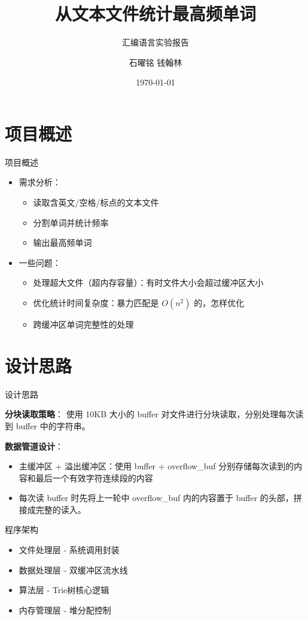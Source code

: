 \documentclass{beamer}
\title{从文本文件统计最高频单词}
\subtitle{汇编语言实验报告}
\author{石曜铭 钱翰林}
\institute{UCAS}
\date{\today}
\begin{document}
\begin{frame}
\titlepage
\end{frame}

\section{项目概述}
\begin{frame}{项目概述}
\begin{itemize}
\item 需求分析：
\begin{itemize}
\item 读取含英文/空格/标点的文本文件
\item 分割单词并统计频率
\item 输出最高频单词
\end{itemize}
\item 一些问题：
\begin{itemize}
\item 处理超大文件（超内存容量）：有时文件大小会超过缓冲区大小
\item 优化统计时间复杂度：暴力匹配是 $O(n^2)$ 的，怎样优化
\item 跨缓冲区单词完整性的处理
\end{itemize}
\end{itemize}
\end{frame}

\section{设计思路}

\begin{frame}{设计思路}

\textbf{分块读取策略}：
使用 10KB 大小的 buffer 对文件进行分块读取，分别处理每次读到 buffer 中的字符串。

\textbf{数据管道设计}：
\begin{itemize}
\item 主缓冲区 + 溢出缓冲区：使用 buffer + overflow\_buf 分别存储每次读到的内容和最后一个有效字符连续段的内容
\item 每次读 buffer 时先将上一轮中 overflow\_buf 内的内容置于 buffer 的头部，拼接成完整的读入。
\end{itemize}
\end{frame}

\begin{frame}{程序架构}

\begin{itemize}
\item 文件处理层 - 系统调用封装
\item 数据处理层 - 双缓冲区流水线
\item 算法层 - Trie树核心逻辑
\item 内存管理层 - 堆分配控制
\end{itemize}
\end{frame}
\end{document}
